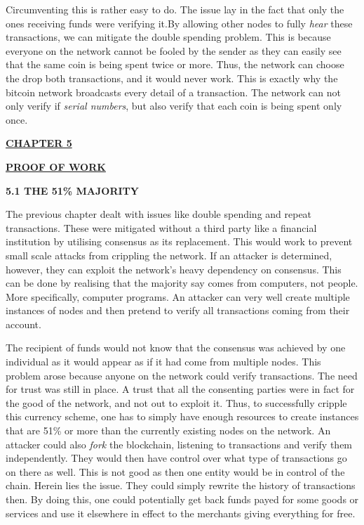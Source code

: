 \documentclass[12pt,a4paper]{report}
\begin{document}
\begin{flushleft}
Circumventing this is rather easy to do. The issue lay in the fact that only the ones receiving funds were verifying it.By allowing other nodes to fully \textit{hear} these transactions, we can mitigate the double spending problem. This is because everyone on the network cannot be fooled by the sender as they can easily see that the same coin is being spent twice or more. Thus, the network can choose the drop both transactions, and it would never work.\newline
This is exactly why the bitcoin network broadcasts every detail of a transaction. The network can not only verify if \textit{serial numbers}, but also verify that each coin is being spent only once.

\newpage
\begin{center}\underline{  \Large\textbf{CHAPTER 5}}\end{center}
\begin{center}\underline{ \Large \textbf{PROOF OF WORK}}\end{center}
\vspace{10mm}

\textbf{5.1 THE 51\% MAJORITY}
\vspace{10mm}

The previous chapter dealt with issues like double spending and repeat transactions. These were mitigated without a third party like a financial institution by utilising consensus as its replacement. This would work to prevent small scale attacks from crippling the network.\newline
If an attacker is determined, however, they can exploit the network's heavy dependency on consensus. This can be done by realising that the majority say comes from computers, not people. More specifically, computer programs. An attacker can very well create multiple instances of nodes and then pretend to verify all transactions coming from their account. 
\vspace{10mm}

The recipient of funds would not know that the consensus was achieved by one individual as it would appear as if it had come from multiple nodes. This problem arose because anyone on the network could verify transactions. The need for trust was still in place. A trust that all the consenting parties were in fact for the good of the network, and not out to exploit it.\newline
Thus, to successfully cripple this currency scheme, one has to simply have enough resources to create instances that are 51\% or more than the currently existing nodes on the network.\newline
An attacker could also \textit{fork} the blockchain, listening to transactions and verify them independently. They would then have control over what type of transactions go on there as well. This is not good as then one entity would be in control of the chain. Herein lies the issue. They could simply rewrite the history of transactions then. By doing this, one could potentially get back funds payed for some goods or services and use it elsewhere in effect to the merchants giving everything for free.
\newline


\end{flushleft}
\end{document}
